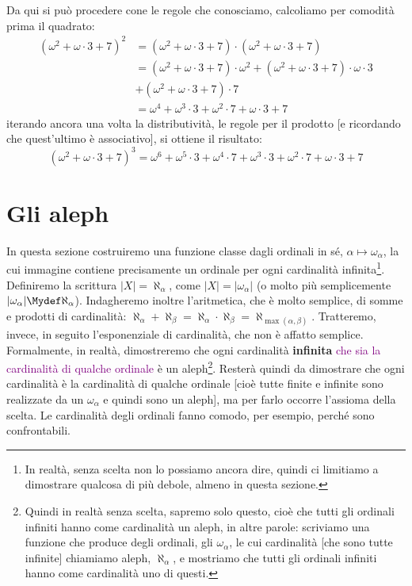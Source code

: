 \documentclass[11pt]{scrartcl}
\begin{document}
\begin{example}
\begin{itemize}
		Da qui si può procedere cone le regole che conosciamo, calcoliamo per comodità prima il quadrato:
		\[ \begin{split}
			(\omega^2 + \omega \cdot 3 + 7)^2 &= (\omega^2 + \omega \cdot 3 + 7) \cdot (\omega^2 + \omega \cdot 3 + 7) \\
											  &= (\omega^2 + \omega \cdot 3 + 7) \cdot \omega^2 + (\omega^2 + \omega \cdot 3 + 7) \cdot \omega \cdot 3 \\
											  &+ (\omega^2 + \omega \cdot 3 + 7) \cdot 7 \\
											  &= \omega^4 + \omega^3 \cdot 3 + \omega^2\cdot 7 + \omega \cdot 3 + 7
		\end{split}
			\]
		iterando ancora una volta la distributività, le regole per il prodotto [e ricordando che quest'ultimo è associativo], si ottiene il risultato:
		\[ (\omega^2 + \omega \cdot 3 + 7)^3 = \omega^6 + \omega^5 \cdot 3 + \omega^4 \cdot 7 + \omega^3 \cdot 3 + \omega^2\cdot 7 + \omega \cdot 3 + 7
			\]
	\end{itemize}
\end{example}

\pagebreak
\section{Gli aleph}
In questa sezione costruiremo una funzione classe dagli ordinali in sé, $\alpha \mapsto \omega_\alpha$, la cui immagine contiene precisamente un ordinale per ogni cardinalità infinita\footnote{In realtà, senza scelta non lo possiamo ancora dire, quindi ci limitiamo a dimostrare qualcosa di più debole, almeno in questa sezione.}.
Definiremo la scrittura $|X| = \aleph_\alpha$, come $|X| = |\omega_\alpha|$ (o molto più semplicemente $|\omega_\alpha| \Mydef \aleph_\alpha$). Indagheremo inoltre l'aritmetica, che è molto semplice, di somme e prodotti di cardinalità: $\aleph_\alpha + \aleph_\beta = \aleph_\alpha \cdot \aleph_\beta = \aleph_{\max(\alpha,\beta)}$.
Tratteremo, invece, in seguito l'esponenziale di cardinalità, che non è affatto semplice.\\
Formalmente, in realtà, dimostreremo che ogni cardinalità \textbf{infinita} \textcolor{purple}{che sia la cardinalità di qualche ordinale} è un aleph\footnote{Quindi in realtà senza scelta, sapremo solo questo, cioè che tutti gli ordinali infiniti hanno come cardinalità un aleph, in altre parole: scriviamo una funzione che produce degli ordinali, gli $\omega_\alpha$, le cui cardinalità [che sono tutte infinite] chiamiamo aleph, $\aleph_\alpha$, e mostriamo che tutti gli ordinali infiniti hanno come cardinalità uno di questi.}. Resterà quindi da dimostrare che ogni cardinalità è la cardinalità di qualche ordinale [cioè tutte finite e infinite sono realizzate da un $\omega_\alpha$ e quindi sono un aleph], ma per farlo occorre l'assioma della scelta.
Le cardinalità degli ordinali fanno comodo, per esempio, perché sono confrontabili.
\end{document}

